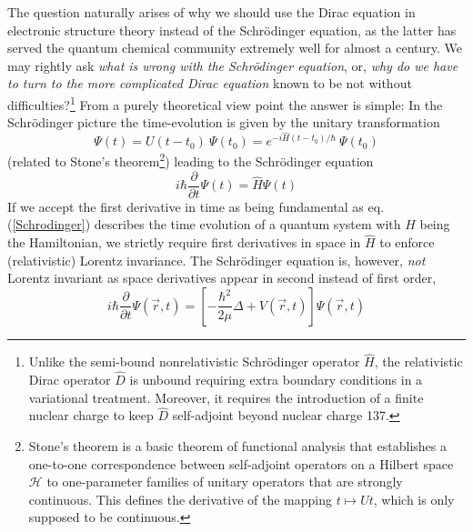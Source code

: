 \documentclass[12pt]{article}
\begin{document}
The question naturally arises of why we should use the Dirac equation in electronic structure theory instead of the Schr\"odinger equation, as the latter has served the quantum chemical community extremely well for almost a century. We may rightly ask {\it what is wrong with the Schr\"odinger equation}, or, {\it why do we have to turn to the more complicated Dirac equation} known to be not without difficulties?\footnote{Unlike the semi-bound nonrelativistic Schr\"odinger operator $\hat{H}$, the relativistic Dirac operator $\hat{D}$ is unbound requiring extra boundary conditions in a variational treatment. Moreover, it requires the introduction of a finite nuclear charge to keep $\hat{D}$ self-adjoint beyond nuclear charge 137.} From a purely theoretical view point the answer is simple: In the Schr\"odinger picture the time-evolution is given by the unitary transformation
\begin{equation}
   \Psi (t) = U(t-t_0) ~\Psi (t_0) = e^{-i\hat{H}(t-t_0)/\hbar} ~\Psi (t_0)
   \label{timeevo}
\end{equation}
(related to Stone's theorem\footnote{Stone's theorem is a basic theorem of functional analysis that establishes a one-to-one correspondence between self-adjoint operators on a Hilbert space $\mathcal{H}$ to one-parameter families of unitary operators that are strongly continuous. This defines the derivative of the mapping $t\mapsto Ut$, which is only supposed to be continuous.}) leading to the Schr\"odinger equation
\begin{equation}
   i \hbar \frac{\partial}{\partial t} \Psi (t) = \hat{H} \Psi (t)
   \label{Schrodinger}
\end{equation}
If we accept the first derivative in time as being fundamental as eq.(\ref{Schrodinger}) describes the time evolution of a quantum system with $H$ being the Hamiltonian, we strictly require first derivatives in space in $\hat{H}$ to enforce (relativistic) Lorentz invariance. The Schr\"odinger equation is, however, {\it not} Lorentz invariant as space derivatives appear in second instead of first order,
\begin{equation}
   i \hbar \frac{\partial}{\partial t} \Psi (\vec{r},t) = \left[ -\frac{\hbar^2}{2\mu} \Delta + V(\vec{r},t)\right] \Psi (\vec{r},t)
   \label{Schrodinger1}
\end{equation}
\end{document}
